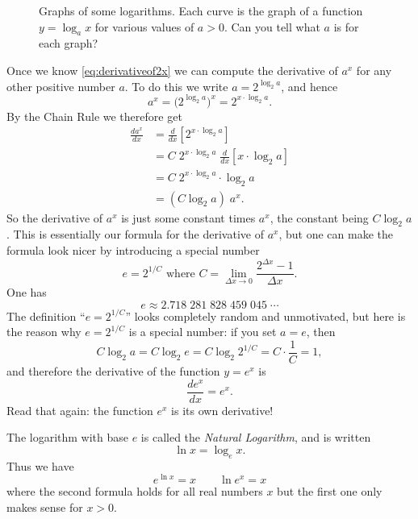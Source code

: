 \begin{figure}[!t]\centering
  
  \caption{Graphs of some logarithms.  Each curve is the graph of a
    function $y=\log_a x$ for various values of $a>0$.  Can you tell
    what $a$ is for each graph?}
  \label{fig:07logplot}
\end{figure}








Once we know \eqref{eq:derivativeof2x} we can compute the derivative of $a^x$
for any other positive number $a$. To do this we write $a=2^{\log_2 a}$,
and hence
\[
a^x = \bigl( 2^{\log_2 a} \bigr)^x = 2^{x\cdot \log_2 a}.
\]
By the Chain Rule we therefore get
\begin{align*}
  \frac{da^x}{dx} &= \frac{d}{dx}\left[2^{x\cdot \log_2 a}\right] \\
  &= C\;2^{x\cdot \log_2 a}\; \frac{d}{dx}\left[x\cdot \log_2 a\right] \\
  &=C\;2^{x\cdot \log_2 a}\cdot \log_2 a \\
  &= (C\log_2 a) \;a^x.
\end{align*}
So the derivative of $a^x$ is just some constant times $a^x$, the constant being
$C\log_2a$.  This is essentially our formula for the derivative of $a^x$, but
one can make the formula look nicer by introducing a special number
\[
e=2^{1/C}\text{ where  }
C=\lim_{ \Delta x\to0} \frac{2^{ \Delta x} - 1}{ \Delta x}.
\]
One has
\[
e\approx 2.718\;281\;828\;459\;045\;\cdots
\]
The definition ``$e = 2^{1/C}$'' looks completely random and
unmotivated, but here is the reason why $e=2^{1/C}$ is a special
number: if you set $a=e$, then
\[
C\log_2 a = C\log_2 e = C\log_2 2^{1/C} = C\cdot \frac1C =1,
\]
and therefore the derivative of the function $y=e^x$ is
\begin{equation}
  \label{eq:derivative-of-ex}
  \frac{de^x}{dx} = e^x.
\end{equation}
Read that again: the function $e^x$ is its own derivative!




The logarithm with base $e$ is called the \emph{Natural Logarithm},
and is written
\[
\ln x = \log_e x.
\]
Thus we have
\begin{equation}
  e^{\ln x}  = x \qquad  \ln e^x = x
\end{equation}
where the second formula holds for all real numbers $x$ but the first one
only makes sense for $x>0$.




